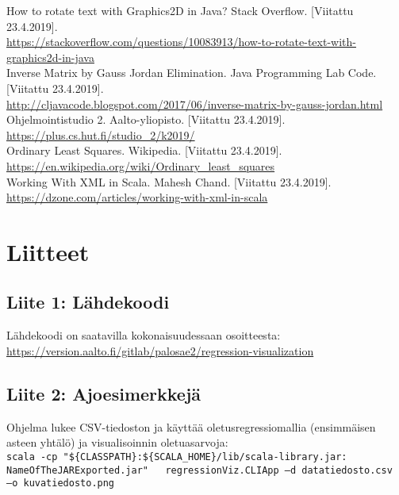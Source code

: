 \documentclass{article}
\begin{document}
        How to rotate text with Graphics2D in Java? Stack Overflow. [Viitattu 23.4.2019]. \\
        \url{https://stackoverflow.com/questions/10083913/how-to-rotate-text-with-graphics2d-in-java} \\

        Inverse Matrix by Gauss Jordan Elimination. Java Programming Lab Code. [Viitattu 23.4.2019]. \\
        \url{http://cljavacode.blogspot.com/2017/06/inverse-matrix-by-gauss-jordan.html} \\

        Ohjelmointistudio 2. Aalto-yliopisto. [Viitattu 23.4.2019]. \\
        \url{https://plus.cs.hut.fi/studio\_2/k2019/} \\

        Ordinary Least Squares. Wikipedia. [Viitattu 23.4.2019]. \\
        \url{https://en.wikipedia.org/wiki/Ordinary\_least\_squares} \\

        Working With XML in Scala. Mahesh Chand. [Viitattu 23.4.2019]. \\
        \url{https://dzone.com/articles/working-with-xml-in-scala} \\

\section{Liitteet}    

        \subsection{Liite 1: Lähdekoodi}
        Lähdekoodi on saatavilla kokonaisuudessaan osoitteesta: \\
        \url{https://version.aalto.fi/gitlab/palosae2/regression-visualization}

        \subsection{Liite 2: Ajoesimerkkejä}
        Ohjelma lukee CSV-tiedoston ja käyttää oletusregressiomallia (ensimmäisen asteen yhtälö)
        ja visualisoinnin oletuasarvoja:\\

  \texttt{scala -cp "\$\{CLASSPATH\}:\$\{SCALA\_HOME\}/lib/scala-library.jar:} \\
  \texttt{NameOfTheJARExported.jar" \, regressionViz.CLIApp --d datatiedosto.csv} \\
  \texttt{--o kuvatiedosto.png} \\
\end{document}
